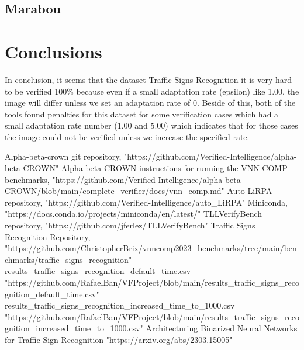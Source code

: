 \documentclass[12pt,a4paper]{report}
\newcommand\tab[1][5mm]{\hspace*{#1}}
\begin{document}
\section{Marabou}
\chapter{Conclusions}
\tab In conclusion, it seems that the dataset Traffic Signs Recognition\cite{traffic_signs_recognition} it is very hard to be verified 100\% because even if a small adaptation rate (epsilon) like 1.00, the image will differ unless we set an adaptation rate of 0. Beside of this, both of the tools found penalties for this dataset for some verification cases which had a small adaptation rate number (1.00 and 5.00) which indicates that for those cases the image could not be verified unless we increase the specified rate.

\begin{thebibliography}{1}
 Alpha-beta-crown git repository, "https://github.com/Verified-Intelligence/alpha-beta-CROWN"
 Alpha-beta-CROWN instructions for running the VNN-COMP benchmarks, "https://github.com/Verified-Intelligence/alpha-beta-CROWN/blob/main/complete\_verifier/docs/vnn\_comp.md"
 Auto-LiRPA repository, "https://github.com/Verified-Intelligence/auto\_LiRPA"
 Miniconda, "https://docs.conda.io/projects/miniconda/en/latest/"
 TLLVerifyBench repository, "https://github.com/jferlez/TLLVerifyBench"
 Traffic Signs Recognition Repository, "https://github.com/ChristopherBrix/vnncomp2023\_benchmarks/tree/main/benchmarks/traffic\_signs\_recognition"
 results\_traffic\_signs\_recognition\_default\_time.csv
"https://github.com/RafaelBan/VFProject/blob/main/results\_traffic\_signs\_recognition\_default\_time.csv"
 results\_traffic\_signs\_recognition\_increased\_time\_to\_1000.csv
"https://github.com/RafaelBan/VFProject/blob/main/results\_traffic\_signs\_recognition\_increased\_time\_to\_1000.csv"
Architecturing Binarized Neural Networks for Traffic Sign Recognition
"https://arxiv.org/abs/2303.15005"
\end{thebibliography}
\end{document}
